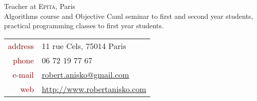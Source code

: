 \documentclass[a4paper, 10pt]{article}
\newcommand{\myurl}[1]{\fontspec{Gill Sans}\fontsize{10pt}{0pt}\selectfont #1}%
\begin{document}
\begin{minipage}[t]{0.59\linewidth}
    {\large Teacher at \textsc{Epita}, Paris}\\[5pt]
    Algorithms course and Objective Caml seminar to first and second year students, practical programming classes to first year students.

    \vspace{5em}

    {\large 
	\begin{tabular}{@{}rl}
    \textcolor{maroon}{address} &
    11 rue Cels, 75014 Paris\\
    \textcolor{maroon}{phone} &
    06 72 19 77 67\\
    \textcolor{maroon}{e-mail} &
    {\myurl \url{robert.anisko@gmail.com}}\\
    \textcolor{maroon}{web} &
    {\myurl \url{http://www.robertanisko.com}}\\
    \end{tabular}}
  \end{minipage}
  \hfill
\end{document}
